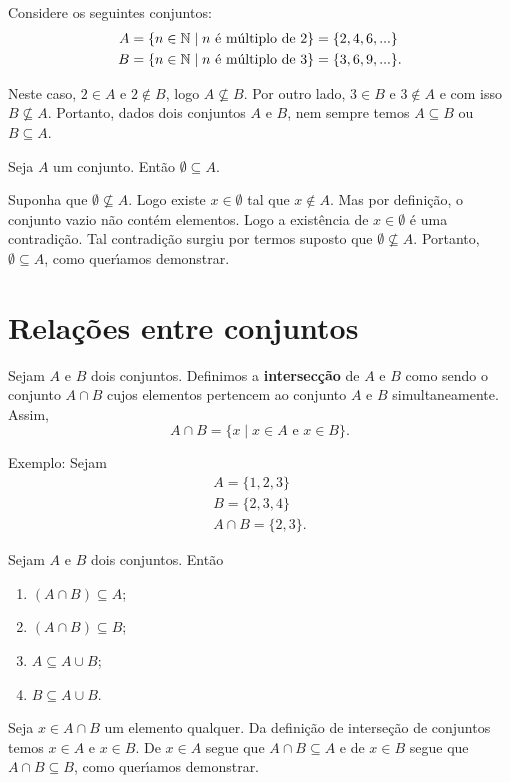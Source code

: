 Considere os seguintes conjuntos:
\begin{align*}
	A &= \{ n \in \mathbb{N} \mid n \mbox{ {\'e} m{\'u}ltiplo de } 2\} = \{2,4,6,...\}\\
	B &= \{n \in \mathbb{N} \mid n \mbox{ {\'e} m{\'u}ltiplo de } 3\} = \{3,6,9,...\}.
\end{align*}


Neste caso, $2 \in A$ e $2 \notin B$, logo $A \nsubseteq B$. Por outro lado, $3 \in B$ e $3 \notin A$ e com isso $B \nsubseteq A$. Portanto, dados dois conjuntos $A$ e $B$, nem sempre temos $A \subseteq B$ ou $B \subseteq A$.

\begin{proposicao} 
	Seja $A$ um conjunto. Ent{\~a}o $ \emptyset \subseteq A$.
\end{proposicao}
\begin{prova}
	Suponha que $\emptyset \nsubseteq A$. Logo existe $x \in \emptyset$ tal que $x \notin A$. Mas por defini{\c c}{\~a}o, o conjunto vazio n{\~a}o cont{\'e}m elementos. Logo a exist\^encia de $x \in \emptyset$ {\'e} uma contradi{\c c}{\~a}o. Tal contradi\c{c}\~ao surgiu por termos suposto que $\emptyset \nsubseteq A$. Portanto, $\emptyset \subseteq A$, como quer{\'\i}amos demonstrar.
\end{prova}

\section{Rela{\c c}{\~o}es entre conjuntos}

\begin{definicao}[Intersec{\c c}{\~a}o]
Sejam $A$ e $B$ dois conjuntos. Definimos a \textbf{intersec{\c c}{\~a}o} de $A$ e $B$ como sendo o conjunto $A \cap B$ cujos elementos pertencem ao conjunto $A$ e $B$ simultaneamente. Assim,
\[
A \cap B = \{x \mid x \in A\mbox{ e }  x \in B\}.
\]
\end{definicao}

Exemplo: Sejam
\begin{align*}
	A = \{1,2,3\}\\
	B = \{2,3,4\}\\
	A \cap B = \{2,3\}.
\end{align*}

\begin{proposicao} Sejam $A$ e $B$ dois conjuntos. Ent{\~a}o
\begin{enumerate}
\item $(A \cap B) \subseteq A$;
\item $(A \cap B) \subseteq B$;
\item $A \subseteq A \cup B$;
\item $B \subseteq A \cup B$.
\end{enumerate}
\end{proposicao}
\begin{prova}
	Seja $x \in A \cap B$ um elemento qualquer. Da defini\c{c}\~ao de interse\c{c}\~ao de conjuntos temos $x \in A$ e $x \in B$. De $x \in A$ segue que $A \cap B \subseteq A$ e de $x \in B$ segue que $A \cap B \subseteq B$, como quer{\'\i}amos demonstrar.
\end{prova}

